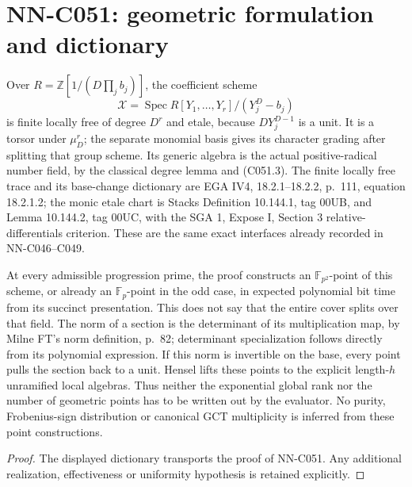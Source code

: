 \section{NN-C051: geometric formulation and dictionary}
\begin{geometricstatement}[NN-C051]
Over $R=\mathbb Z[1/(D\prod_jb_j)]$, the coefficient scheme
\[
       \mathcal X=\operatorname{Spec}
          R[Y_1,\ldots,Y_r]/(Y_j^D-b_j)
\]
is finite locally free of degree $D^r$ and etale, because
$DY_j^{D-1}$ is a unit. It is a torsor under $\mu_D^r$;
the separate monomial basis gives its character grading after
splitting that group scheme. Its generic algebra is the
actual positive-radical number field, by the classical
degree lemma and (C051.3). The finite locally free trace and
its base-change dictionary are EGA IV4, 18.2.1--18.2.2, p.~111,
equation 18.2.1.2; the monic etale chart is Stacks
Definition 10.144.1, tag 00UB, and Lemma 10.144.2, tag 00UC,
with the SGA 1, Expose I, Section 3 relative-differentials
criterion. These are the same exact interfaces already
recorded in NN-C046--C049.

At every admissible progression prime, the proof constructs
an $\mathbb F_{p^2}$-point of this scheme, or already an
$\mathbb F_p$-point in the odd case, in expected polynomial
bit time from its succinct presentation. This does not say
that the entire cover splits over that field. The norm of a
section is the determinant of its multiplication map, by
Milne FT's norm definition, p.~82; determinant specialization
follows directly from its polynomial expression. If
this norm is invertible on the base, every point pulls the
section back to a unit. Hensel lifts these points to the
explicit length-$h$ unramified local algebras. Thus neither
the exponential global rank nor the number of geometric
points has to be written out by the evaluator. No purity,
Frobenius-sign distribution or canonical GCT multiplicity
is inferred from these point constructions.
\end{geometricstatement}
\begin{proof} The displayed dictionary transports the proof of NN-C051. Any additional realization, effectiveness or uniformity hypothesis is retained explicitly.\end{proof}


